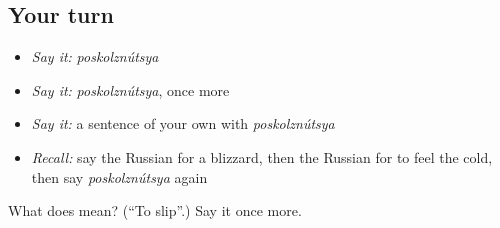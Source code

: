 \subsection*{Your turn}
\begin{itemize}
\raggedright
  \item \emph{Say it:} \emph{poskolznútsya}
  \item \emph{Say it:} \emph{poskolznútsya}, once more
  \item \emph{Say it:} a sentence of your own with \emph{poskolznútsya}
  \item \emph{Recall:} say the Russian for a blizzard, then the Russian for to feel the cold, then say \emph{poskolznútsya} again
\end{itemize}

\begin{tcolorbox}[breakable,colback=teal!4,colframe=teal!35!black,title={Before you move on}]
What does  mean? (\textquotedblleft{}To slip\textquotedblright{}.) Say it once more.
\end{tcolorbox}
